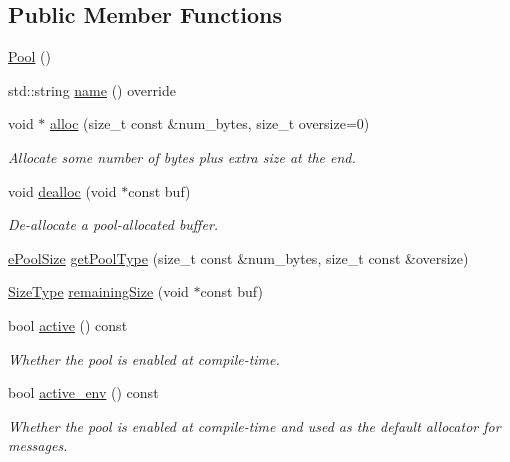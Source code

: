 \subsection*{Public Member Functions}
\begin{DoxyCompactItemize}
\item 
\hyperlink{structvt_1_1pool_1_1_pool_a55a236c42c331940884370c85fb18e36}{Pool} ()
\item 
std\+::string \hyperlink{structvt_1_1pool_1_1_pool_a02fa54fc3cca0d388f25f397dfd997ab}{name} () override
\item 
void $\ast$ \hyperlink{structvt_1_1pool_1_1_pool_a0bf20e8b4ad1b85fb8952d81d433da55}{alloc} (size\+\_\+t const \&num\+\_\+bytes, size\+\_\+t oversize=0)
\begin{DoxyCompactList}\small\item\em Allocate some number of bytes plus extra size at the end. \end{DoxyCompactList}\item 
void \hyperlink{structvt_1_1pool_1_1_pool_a73ef123aa04b44ae875716e2c7b95cab}{dealloc} (void $\ast$const buf)
\begin{DoxyCompactList}\small\item\em De-\/allocate a pool-\/allocated buffer. \end{DoxyCompactList}\item 
\hyperlink{structvt_1_1pool_1_1_pool_ace8d36439e5e599a8ee68b2f1a6a6b28}{e\+Pool\+Size} \hyperlink{structvt_1_1pool_1_1_pool_a9aa5afbbea5a61265746c4d461502d62}{get\+Pool\+Type} (size\+\_\+t const \&num\+\_\+bytes, size\+\_\+t const \&oversize)
\item 
\hyperlink{structvt_1_1pool_1_1_pool_a4030898e09d0160c24743a7b949c0d46}{Size\+Type} \hyperlink{structvt_1_1pool_1_1_pool_a7d6742d6abc615255e25363a1be067be}{remaining\+Size} (void $\ast$const buf)
\item 
bool \hyperlink{structvt_1_1pool_1_1_pool_a3f34112821d767815d5049dc83503033}{active} () const
\begin{DoxyCompactList}\small\item\em Whether the pool is enabled at compile-\/time. \end{DoxyCompactList}\item 
bool \hyperlink{structvt_1_1pool_1_1_pool_aa11bdd76d9f6491ac412d5abc5c63274}{active\+\_\+env} () const
\begin{DoxyCompactList}\small\item\em Whether the pool is enabled at compile-\/time and used as the default allocator for messages. \end{DoxyCompactList}\item 

\end{DoxyCompactItemize}
